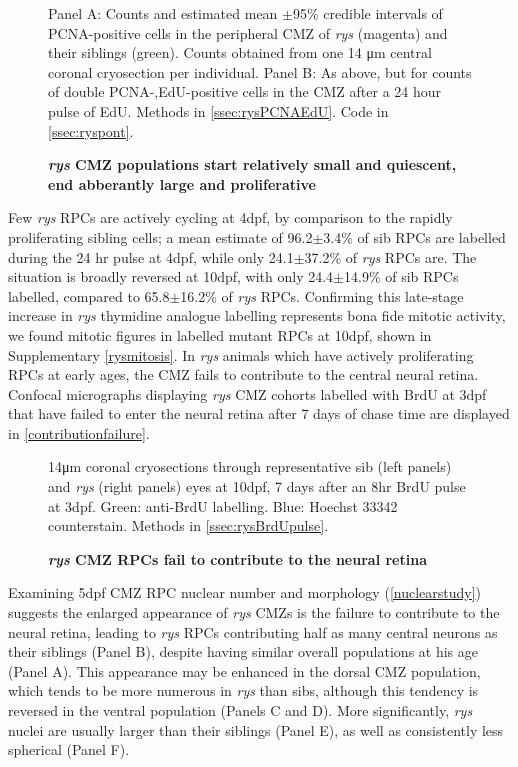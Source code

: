 \begin{figure}[!h]
    \caption{{\bf \textit{rys} CMZ populations start relatively small and quiescent, end abberantly large and proliferative}}
    Panel A: Counts and estimated mean $\pm$95\% credible intervals of PCNA-positive cells in the peripheral CMZ of \textit{rys} (magenta) and their siblings (green). Counts obtained from one 14 \si{\micro\metre} central coronal cryosection per individual.
    Panel B: As above, but for counts of double PCNA-,EdU-positive cells in the CMZ after a 24 hour pulse of EdU.
    \label{rysCMZontogeny}
    Methods in \autoref{ssec:rysPCNAEdU}.
    Code in \autoref{ssec:ryspont}.
\end{figure}
\FloatBarrier

Few \textit{rys} RPCs are actively cycling at 4dpf, by comparison to the rapidly proliferating sibling cells; a mean estimate of 96.2$\pm$3.4\% of sib RPCs are labelled during the 24 hr pulse at 4dpf, while only 24.1$\pm$37.2\% of \textit{rys} RPCs are. The situation is broadly reversed at 10dpf, with only 24.4$\pm$14.9\% of sib RPCs labelled, compared to 65.8$\pm$16.2\% of \textit{rys} RPCs. Confirming this late-stage increase in \textit{rys} thymidine analogue labelling represents bona fide mitotic activity, we found mitotic figures in labelled mutant RPCs at 10dpf, shown in Supplementary \autoref{rysmitosis}. In \textit{rys} animals which have actively proliferating RPCs at early ages, the CMZ fails to contribute to the central neural retina. Confocal micrographs displaying \textit{rys} CMZ cohorts labelled with BrdU at 3dpf that have failed to enter the neural retina after 7 days of chase time are displayed in \autoref{contributionfailure}. 

\begin{figure}[!h]
    \caption{{\bf \textit{rys} CMZ RPCs fail to contribute to the neural retina}}
    14\si{\micro\metre} coronal cryosections through representative sib (left panels) and \textit{rys} (right panels) eyes at 10dpf, 7 days after an 8hr BrdU pulse at 3dpf. Green: anti-BrdU labelling. Blue: Hoechst 33342 counterstain.
    Methods in \autoref{ssec:rysBrdUpulse}.
    \label{contributionfailure}
\end{figure}
\FloatBarrier

Examining 5dpf CMZ RPC nuclear number and morphology (\autoref{nuclearstudy}) suggests the enlarged appearance of \textit{rys} CMZs is the failure to contribute to the neural retina, leading to \textit{rys} RPCs contributing half as many central neurons as their siblings (Panel B), despite having similar overall populations at his age (Panel A). This appearance may be enhanced in the dorsal CMZ population, which tends to be more numerous in \textit{rys} than sibs, although this tendency is reversed in the ventral population (Panels C and D). More significantly, \textit{rys} nuclei are usually larger than their siblings (Panel E), as well as consistently less spherical (Panel F).

